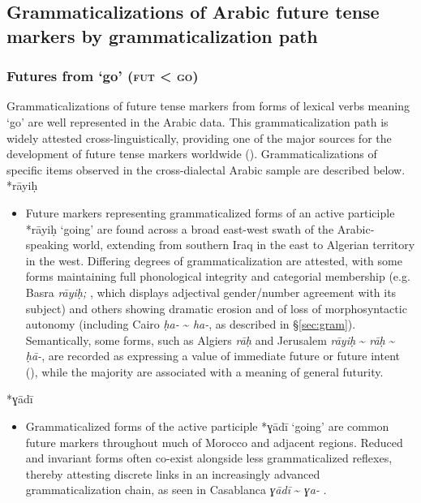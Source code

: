 \documentclass[output=paper]{langsci/langscibook}
\begin{document}
\subsection{Grammaticalizations of Arabic future tense markers by grammaticalization path}\label{sec:fut}
\subsubsection{ Futures from ‘go’ (\textsc{fut} < \textsc{go})}

Grammaticalizations of future tense markers from forms of lexical verbs meaning ‘go’ are well represented in the Arabic data. This grammaticalization path is widely attested cross-linguistically, providing one of the major sources for the development of future tense markers worldwide (\citealt{Bybee1994,HeineKuteva2002}). Grammaticalizations of specific items observed in the cross-dialectal Arabic sample are described below.
\newpage
*rāyiḥ

\begin{itemize}

  \item[]
Future markers representing grammaticalized forms of an active participle *rāyiḥ ‘going’ are found across a broad east-west swath of the Arabic-speaking world, extending from southern Iraq in the east to Algerian territory in the west. Differing degrees of grammaticalization are attested, with some forms maintaining full phonological integrity and categorial membership (e.g. Basra \textit{rāyiḥ;} \citealt{Mahdi1985}, which displays adjectival gender/number agreement with its subject) and others showing dramatic erosion and of loss of morphosyntactic autonomy (including Cairo \textit{ḥa-} {\textasciitilde} \textit{ha-}, as described in §\ref{sec:gram}). Semantically, some forms, such as Algiers \textit{rāḥ} and Jerusalem \textit{rāyiḥ} {\textasciitilde} \textit{rāḥ} {\textasciitilde} \textit{ḥā-}, are recorded as expressing a value of immediate future or future intent (\citealt{Boucherit2011,Rosenhouse2011}), while the majority are associated with a meaning of general futurity.
\end{itemize}
 
*ɣādī

\begin{itemize}

  \item[]
Grammaticalized forms of the active participle *ɣādī ‘going’ are common future markers throughout much of Morocco and adjacent regions. Reduced and invariant forms often co-exist alongside less grammaticalized reflexes, thereby attesting discrete links in an increasingly advanced grammaticalization chain, as seen in Casablanca \textit{ɣādī} {\textasciitilde} \textit{ɣa-} \citep{Caubet2011}.
\end{itemize}
 
\end{document}
